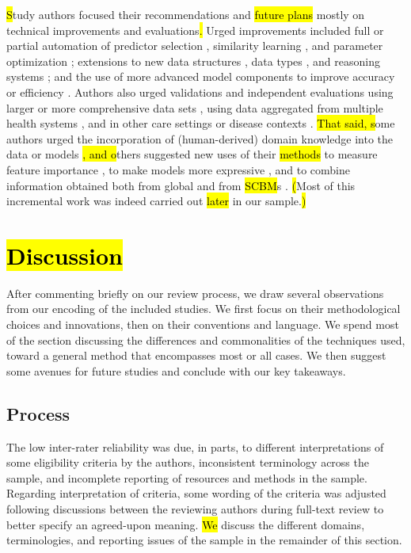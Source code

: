 \documentclass[sn-mathphys,Numbered,pdflatex]{sn-jnl}
\theoremstyle{remark}
\theoremstyle{definition}
\begin{document}
\hl{S}tudy authors focused their recommendations and \hl{future plans}
mostly on technical improvements and evaluations\hl{.} Urged
improvements included full or partial automation of predictor selection
\citep{Mariuzzi1997, Yearwood1997}, similarity learning
\citep{Mariuzzi1997, Wang2019}, and parameter optimization
\citep{Song2006, Lee2017}; extensions to new data structures
\citep{Lopez2011}, data types \citep{Liang2015, Verma2015, Malykh2018},
and reasoning systems \citep{Nicolas2014}; and the use of more advanced
model components to improve accuracy or efficiency
\citep{Lowsky2013, Lee2015, Liang2015, Zhang2018}. Authors also urged
validations and independent evaluations using larger or more
comprehensive data sets \citep{Elter2007, Xu2008, Verma2015, Ng2015},
using data aggregated from multiple health systems
\citep{Lee2015, Lee2017, Tang2021, Ng2021}, and in other care settings
or disease contexts \citep{Song2006, Zhang2018, Tang2021, Ng2021}.
\hl{That said, s}ome authors urged the incorporation of (human-derived)
domain knowledge into the data or models
\citep{Yearwood1997, Wang2019}\hl{, and o}thers suggested new uses of
their \hl{methods} to measure feature importance \citep{Wyns2004}, to
make models more expressive \citep{Lee2015}, and to combine information
obtained both from global and from \hl{SCBM}s \citep{Ng2015}. \hl{(}Most
of this incremental work was indeed carried out \hl{later} in our
sample.\hl{)}

\section{\texorpdfstring{\hl{Discussion}}{}}\label{section}

After commenting briefly on our review process, we draw several
observations from our encoding of the included studies. We first focus
on their methodological choices and innovations, then on their
conventions and language. We spend most of the section discussing the
differences and commonalities of the techniques used, toward a general
method that encompasses most or all cases. We then suggest some avenues
for future studies and conclude with our key takeaways.

\subsection{Process}\label{process}

The low inter-rater reliability was due, in parts, to different
interpretations of some eligibility criteria by the authors,
inconsistent terminology across the sample, and incomplete reporting of
resources and methods in the sample. Regarding interpretation of
criteria, some wording of the criteria was adjusted following
discussions between the reviewing authors during full-text review to
better specify an agreed-upon meaning. \hl{We }discuss the different
domains, terminologies, and reporting issues of the sample in the
remainder of this section.
\end{document}
